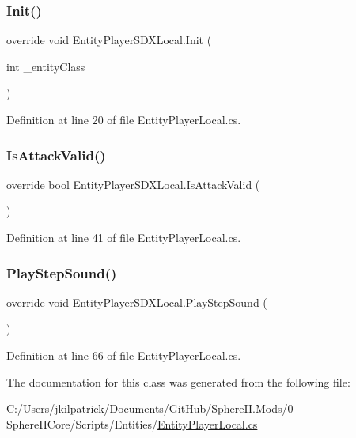 \subsubsection{\texorpdfstring{Init()}{Init()}}
{\footnotesize\ttfamily override void Entity\+Player\+S\+D\+X\+Local.\+Init (\begin{DoxyParamCaption}\item[{int}]{\+\_\+entity\+Class }\end{DoxyParamCaption})}



Definition at line 20 of file Entity\+Player\+Local.\+cs.

\mbox{\label{class_entity_player_s_d_x_local_a389bd4d43007414092ca71759ccded49}} 
\subsubsection{\texorpdfstring{IsAttackValid()}{IsAttackValid()}}
{\footnotesize\ttfamily override bool Entity\+Player\+S\+D\+X\+Local.\+Is\+Attack\+Valid (\begin{DoxyParamCaption}{ }\end{DoxyParamCaption})}



Definition at line 41 of file Entity\+Player\+Local.\+cs.

\mbox{\label{class_entity_player_s_d_x_local_ae9ed4a028520ad3da3f8862ad46de878}} 
\subsubsection{\texorpdfstring{PlayStepSound()}{PlayStepSound()}}
{\footnotesize\ttfamily override void Entity\+Player\+S\+D\+X\+Local.\+Play\+Step\+Sound (\begin{DoxyParamCaption}{ }\end{DoxyParamCaption})}



Definition at line 66 of file Entity\+Player\+Local.\+cs.



The documentation for this class was generated from the following file\+:\begin{DoxyCompactItemize}
\item 
C\+:/\+Users/jkilpatrick/\+Documents/\+Git\+Hub/\+Sphere\+I\+I.\+Mods/0-\/\+Sphere\+I\+I\+Core/\+Scripts/\+Entities/\mbox{\hyperlink{_entity_player_local_8cs}{Entity\+Player\+Local.\+cs}}\end{DoxyCompactItemize}

